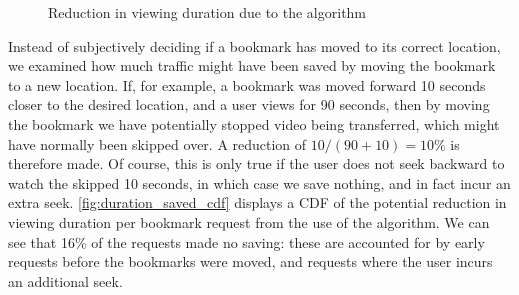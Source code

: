 \begin{figure}[t]
    \centering


    \caption{Reduction in viewing duration due to the algorithm}

\end{figure}


Instead of subjectively deciding if a bookmark has moved to its correct location, we examined how much traffic might have been saved by moving the bookmark to a new location. If, for example, a bookmark was moved forward 10 seconds closer to the desired location, and a user views for 90 seconds, then by moving the bookmark we have potentially stopped video being transferred, which might have normally been skipped over. A reduction of $10/(90+10)=10\%$ is therefore made. Of course, this is only true if the user does not seek backward to watch the skipped 10 seconds, in which case we save nothing, and in fact incur an extra seek. \autoref{fig:duration_saved_cdf} displays a CDF of the potential reduction in viewing duration per bookmark request from the use of the algorithm. We can see that 16\% of the requests made no saving: these are accounted for by early requests before the bookmarks were moved, and requests where the user incurs an additional seek.

